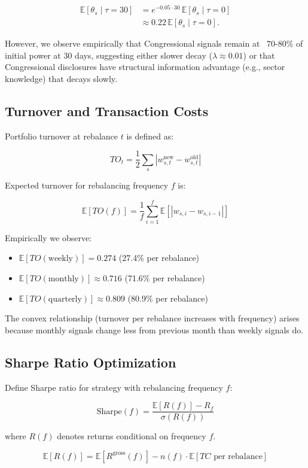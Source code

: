 \documentclass[twocolumn,ieee]{Base_Latex_Template/arithmaxresearch}
\begin{document}
\begin{align}
\mathbb{E}[\theta_s \mid \tau=30]
&= e^{-0.05 \cdot 30}\, \mathbb{E}[\theta_s \mid \tau=0] \\
&\approx 0.22\, \mathbb{E}[\theta_s \mid \tau=0].
\end{align}

However, we observe empirically that Congressional signals remain at ~70-80\% of initial power at 30 days, suggesting either slower decay ($\lambda \approx 0.01$) or that Congressional disclosures have structural information advantage (e.g., sector knowledge) that decays slowly.

\subsection{Turnover and Transaction Costs}

Portfolio turnover at rebalance $t$ is defined as:

$$TO_t = \frac{1}{2} \sum_s |w_{s,t}^{\text{new}} - w_{s,t}^{\text{old}}|$$

Expected turnover for rebalancing frequency $f$ is:

$$\mathbb{E}[TO(f)] = \frac{1}{f} \sum_{i=1}^{f} \mathbb{E}[|w_{s,i} - w_{s,i-1}|]$$

Empirically we observe:
\begin{itemize}
\item $\mathbb{E}[TO(\text{weekly})] = 0.274$ (27.4\% per rebalance)
\item $\mathbb{E}[TO(\text{monthly})] \approx 0.716$ (71.6\% per rebalance)
\item $\mathbb{E}[TO(\text{quarterly})] \approx 0.809$ (80.9\% per rebalance)
\end{itemize}

The convex relationship (turnover per rebalance increases with frequency) arises because monthly signals change less from previous month than weekly signals do.

\subsection{Sharpe Ratio Optimization}

Define Sharpe ratio for strategy with rebalancing frequency $f$:

$$\text{Sharpe}(f) = \frac{\mathbb{E}[R(f)] - R_f}{\sigma(R(f))}$$

where $R(f)$ denotes returns conditional on frequency $f$.

$$\mathbb{E}[R(f)] = \mathbb{E}[R^{\text{gross}}(f)] - n(f) \cdot \mathbb{E}[TC \text{ per rebalance}]$$
\end{document}

